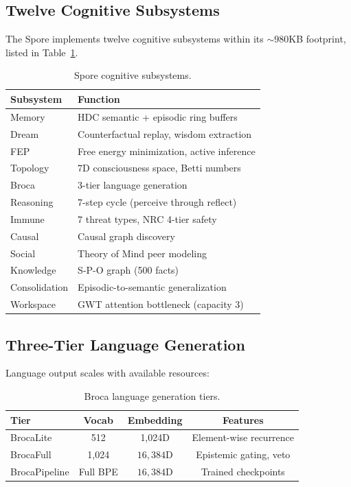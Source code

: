 \documentclass[11pt,twocolumn]{article}
\newcommand{\dimHDC}{16{,}384}
\begin{document}
\subsection{Twelve Cognitive Subsystems}

The Spore implements twelve cognitive subsystems within its ${\sim}980$KB footprint, listed in Table~\ref{tab:subsystems}.

\begin{table}[H]
\centering
\caption{Spore cognitive subsystems.}
\label{tab:subsystems}
\begin{tabular}{lp{4.5cm}}
\toprule
\textbf{Subsystem} & \textbf{Function} \\
\midrule
Memory & HDC semantic + episodic ring buffers \\
Dream & Counterfactual replay, wisdom extraction \\
FEP & Free energy minimization, active inference \\
Topology & 7D consciousness space, Betti numbers \\
Broca & 3-tier language generation \\
Reasoning & 7-step cycle (perceive through reflect) \\
Immune & 7 threat types, NRC 4-tier safety \\
Causal & Causal graph discovery \\
Social & Theory of Mind peer modeling \\
Knowledge & S-P-O graph (500 facts) \\
Consolidation & Episodic-to-semantic generalization \\
Workspace & GWT attention bottleneck (capacity 3) \\
\bottomrule
\end{tabular}
\end{table}

\subsection{Three-Tier Language Generation}

Language output scales with available resources:

\begin{table}[H]
\centering
\caption{Broca language generation tiers.}
\label{tab:broca-tiers}
\begin{tabular}{lccc}
\toprule
\textbf{Tier} & \textbf{Vocab} & \textbf{Embedding} & \textbf{Features} \\
\midrule
BrocaLite & 512 & 1,024D & Element-wise recurrence \\
BrocaFull & 1,024 & $\dimHDC$D & Epistemic gating, veto \\
BrocaPipeline & Full BPE & $\dimHDC$D & Trained checkpoints \\
\bottomrule
\end{tabular}
\end{table}
\end{document}
